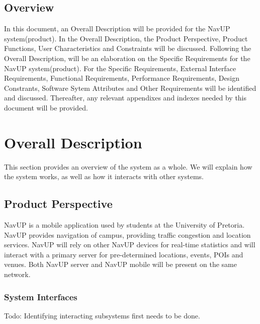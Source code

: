\documentclass{article}
\begin{document}
    \subsection{Overview}
		\begin{flushleft}
			In this document, an Overall Description will be provided for the NavUP system(product). In the Overall Description, the Product Perspective, Product Functions, User Characteristics and Constraints will be discussed. Following the Overall Description, will be an elaboration on the Specific Requirements for the NavUP system(product). For the Specific Requirements, External Interface Requirements, Functional Requirements, Performance Requirements, Design Constrants, Software Sytem Attributes and Other Requirements will be identified and discussed.
Thereafter, any relevant appendixes and indexes needed by this document will be provided.
		\end{flushleft}
\section{Overall Description}

    \begin{flushleft}
        This section provides an overview of the system as a whole. We will explain how the system works, as well as how it interacts with other systems.
    \end{flushleft}
    
    
    \subsection{Product Perspective}
    
        NavUP is a mobile application used by students at the University of Pretoria. NavUP provides navigation of campus, providing traffic congestion and location services. NavUP will rely on other NavUP devices for real-time statistics and will interact with a primary server for pre-determined locations, events, POIs and venues. Both NavUP server and NavUP mobile will be present on the same network.
        \subsubsection{System Interfaces}
        Todo: Identifying interacting subsystems first needs to be done.
\end{document}
